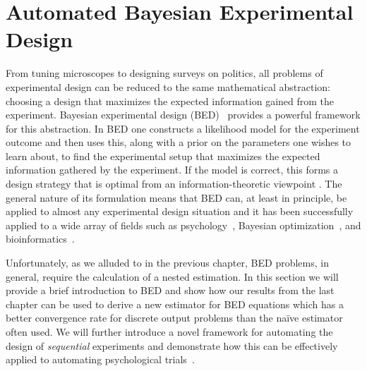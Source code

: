 
\chapter{Automated Bayesian Experimental Design}
\label{chp:design}

From tuning microscopes to designing surveys on politics, all problems of 
experimental design can be reduced to the same mathematical abstraction:
choosing a design that maximizes the expected information gained from the 
experiment.
Bayesian experimental design (BED)~\citep{chaloner1995bayesian,sebastiani2000maximum} 
provides a powerful framework for this abstraction.  In BED
one constructs a likelihood model for the experiment outcome and then uses this, along
with a prior on the parameters one wishes to learn about, to find the experimental setup
that maximizes the expected information gathered by the experiment.  
If the model is correct, this forms a design strategy that is optimal from
an information-theoretic viewpoint \citep{sebastiani2000maximum}.  
The general nature of its formulation means that BED can, at least in principle, be applied
to almost any experimental design situation and it has been successfully applied to a wide
array of fields such as psychology~\citep{myung2013tutorial,vincent2017darc,Cavagnaro:discounting},
Bayesian optimization~\citep{hennig2012entropy,hernandez2014predictive}, and
bioinformatics~\citep{vanlier2012bayesian}.

Unfortunately, as we alluded to in the previous chapter, BED problems, in
general,  require the calculation of a nested estimation.
In this section we will provide a brief introduction to BED and show how our results
from the last chapter can be used to derive a new estimator for BED equations 
which has a better convergence rate for discrete output problems than the na\"{i}ve
estimator often used.  We will further introduce a novel framework for automating the
design of \emph{sequential} experiments and demonstrate how this can be
effectively applied to automating psychological trials~\citep{vincent2017darc}.  




